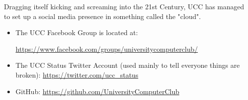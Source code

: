 \begin{mdframed}

Dragging itself kicking and screaming into the 21st Century, UCC has managed to set up a social media presence in something called the "cloud".

\begin{itemize}
\item The UCC Facebook Group is located at: 

\url{https://www.facebook.com/groups/universitycomputerclub/}
\item The UCC Status Twitter Account (used mainly to tell everyone things are broken): \url{https://twitter.com/ucc_status}
\item GitHub: \url{https://github.com/UniversityComputerClub}

\end{itemize}

\end{mdframed}
